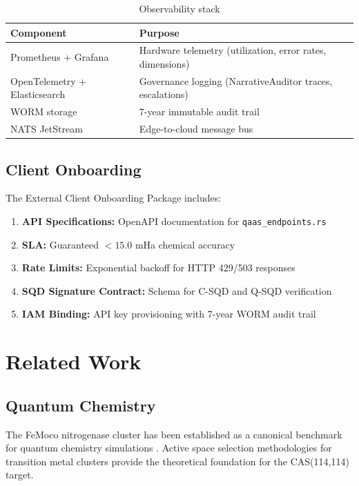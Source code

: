 \documentclass[11pt,a4paper]{article}
\theoremstyle{plain}
\begin{document}
\begin{table}[h]
\centering
\begin{tabular}{ll}
\toprule
\textbf{Component} & \textbf{Purpose} \\
\midrule
Prometheus + Grafana & Hardware telemetry (utilization, error rates, dimensions) \\
OpenTelemetry + Elasticsearch & Governance logging (NarrativeAuditor traces, escalations) \\
WORM storage & 7-year immutable audit trail \\
NATS JetStream & Edge-to-cloud message bus \\
\bottomrule
\end{tabular}
\caption{Observability stack}
\label{tab:observability}
\end{table}

\subsection{Client Onboarding}

The External Client Onboarding Package includes:

\begin{enumerate}
    \item \textbf{API Specifications:} OpenAPI documentation for \texttt{qaas\_endpoints.rs}
    \item \textbf{SLA:} Guaranteed $< 15.0$ mHa chemical accuracy
    \item \textbf{Rate Limits:} Exponential backoff for HTTP 429/503 responses
    \item \textbf{SQD Signature Contract:} Schema for C-SQD and Q-SQD verification
    \item \textbf{IAM Binding:} API key provisioning with 7-year WORM audit trail
\end{enumerate}

\section{Related Work}

\subsection{Quantum Chemistry}

The FeMoco nitrogenase cluster has been established as a canonical benchmark for quantum chemistry simulations \cite{feMocoBenchmark, surfaceCodeEstimates}. Active space selection methodologies for transition metal clusters \cite{activeSpaceMethods} provide the theoretical foundation for the CAS(114,114) target.
\end{document}
